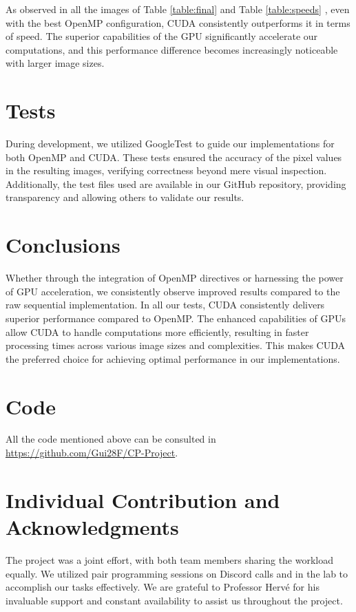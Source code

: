 \documentclass[sigconf]{acmart}
\begin{document}
As observed in all the images of Table \ref{table:final} and Table \ref{table:speeds} , even with the best OpenMP configuration, CUDA consistently outperforms it in terms of speed. The superior capabilities of the GPU significantly accelerate our computations, and this performance difference becomes increasingly noticeable with larger image sizes.

\section{Tests}
During development, we utilized GoogleTest to guide our implementations for both OpenMP and CUDA. These tests ensured the accuracy of the pixel values in the resulting images, verifying correctness beyond mere visual inspection. Additionally, the test files used are available in our GitHub repository, providing transparency and allowing others to validate our results.

\section{Conclusions}
Whether through the integration of OpenMP directives or harnessing the power of GPU acceleration, we consistently observe improved results compared to the raw sequential implementation. In all our tests, CUDA consistently delivers superior performance compared to OpenMP. The enhanced capabilities of GPUs allow CUDA to handle computations more efficiently, resulting in faster processing times across various image sizes and complexities. This makes CUDA the preferred choice for achieving optimal performance in our implementations.

\section{Code}
All the code mentioned above can be consulted in \url{https://github.com/Gui28F/CP-Project}.
\section{Individual Contribution and Acknowledgments}
The project was a joint effort, with both team members sharing the workload equally. We utilized pair programming sessions on Discord calls and in the lab to accomplish our tasks effectively. We are grateful to Professor Hervé for his invaluable support and constant availability to assist us throughout the project.


\end{document}
